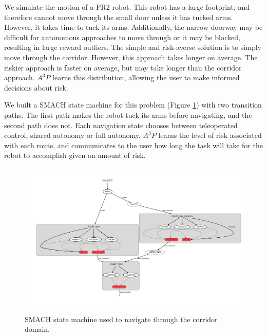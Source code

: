 \documentclass[letterpaper, 10 pt, conference]{ieeeconf}  %
\begin{document}
We simulate the motion of a PR2 \cite{pr2} robot. This robot has a large footprint, and therefore cannot move through the small door unless it has tucked arms. However, it takes time to tuck its arms. Additionally, the narrow doorway may be difficult for autonomous approaches to move through or it may be blocked, resulting in large reward outliers. The simple and risk-averse solution is to simply move through the corridor. However, this approach takes longer on average. The riskier approach is faster on average, but may take longer than the corridor approach. $A^3P$ learns this distribution, allowing the user to make informed decisions about risk.

We built a SMACH state machine for this problem (Figure \ref{SMACH_Corridor}) with two transition paths. The first path makes the robot tuck its arms before navigating, and the second path does not. Each navigation state chooses between teleoperated control, shared autonomy or full autonomy. $A^3P$ learns the level of risk associated with each route, and communicates to the user how long the task will take for the robot to accomplish given an amount of risk. 

\begin{figure}
\centering
\includegraphics[height=20em]{Smach_RL_SM.png}
\caption{SMACH state machine used to navigate through the corridor domain.}
\label{SMACH_Corridor}
\end{figure}
\end{document}
